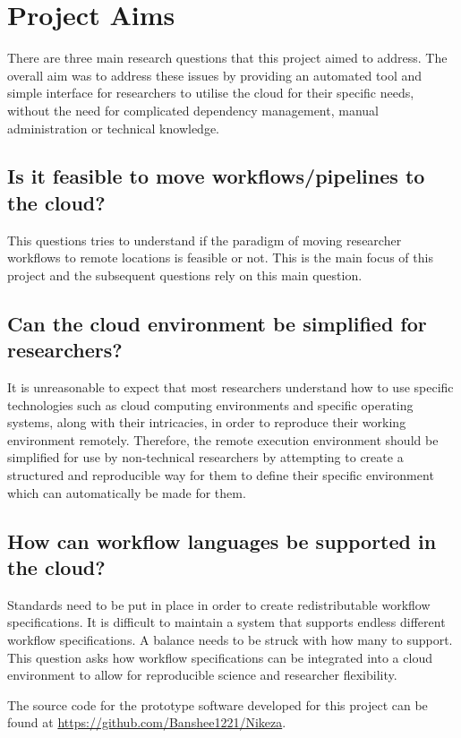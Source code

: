 \section{Project Aims}

There are three main research questions that this project aimed to address. The overall aim was to address these issues by providing an automated tool and simple interface for researchers to utilise the cloud for their specific needs, without the need for complicated dependency management, manual administration or technical knowledge.

\subsection{Is it feasible to move workflows/pipelines to the cloud?}
This questions tries to understand if the paradigm of moving researcher workflows to remote locations is feasible or not. This is the main focus of this project and the subsequent questions rely on this main question.

\subsection{Can the cloud environment be simplified for researchers?}
It is unreasonable to expect that most researchers understand how to use specific technologies such as cloud computing environments and specific operating systems, along with their intricacies, in order to reproduce their working environment remotely. Therefore, the remote execution environment should be simplified for use by non-technical researchers by attempting to create a structured and reproducible way for them to define their specific environment which can automatically be made for them.

\subsection{How can workflow languages be supported in the cloud?}
Standards need to be put in place in order to create redistributable workflow specifications. It is difficult to maintain a system that supports endless different workflow specifications. A balance needs to be struck with how many to support. This question asks how workflow specifications can be integrated into a cloud environment to allow for reproducible science and researcher flexibility.

The source code for the prototype software developed for this project can be found at \url{https://github.com/Banshee1221/Nikeza}.